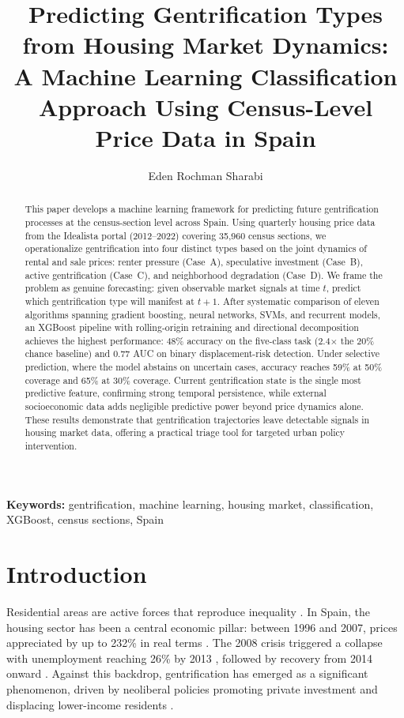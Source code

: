 \documentclass[12pt,a4paper]{article}
\title{Predicting Gentrification Types from Housing Market Dynamics:\\A Machine Learning Classification Approach Using Census-Level Price Data in Spain}
\author{Eden Rochman Sharabi}
\date{}
\begin{document}
\maketitle

\begin{abstract}
This paper develops a machine learning framework for predicting future gentrification processes at the census-section level across Spain. Using quarterly housing price data from the Idealista portal (2012--2022) covering 35,960 census sections, we operationalize gentrification into four distinct types based on the joint dynamics of rental and sale prices: renter pressure (Case~A), speculative investment (Case~B), active gentrification (Case~C), and neighborhood degradation (Case~D). We frame the problem as genuine forecasting: given observable market signals at time $t$, predict which gentrification type will manifest at $t{+}1$. After systematic comparison of eleven algorithms spanning gradient boosting, neural networks, SVMs, and recurrent models, an XGBoost pipeline with rolling-origin retraining and directional decomposition achieves the highest performance: 48\% accuracy on the five-class task (2.4$\times$ the 20\% chance baseline) and 0.77 AUC on binary displacement-risk detection. Under selective prediction, where the model abstains on uncertain cases, accuracy reaches 59\% at 50\% coverage and 65\% at 30\% coverage. Current gentrification state is the single most predictive feature, confirming strong temporal persistence, while external socioeconomic data adds negligible predictive power beyond price dynamics alone. These results demonstrate that gentrification trajectories leave detectable signals in housing market data, offering a practical triage tool for targeted urban policy intervention.
\end{abstract}

\textbf{Keywords:} gentrification, machine learning, housing market, classification, XGBoost, census sections, Spain

\section{Introduction}

Residential areas are active forces that reproduce inequality \citep{park1916suggestions, wacquant2005deux}. In Spain, the housing sector has been a central economic pillar: between 1996 and 2007, prices appreciated by up to 232\% in real terms \citep{arellano2009burbuja}. The 2008 crisis triggered a collapse with unemployment reaching 26\% by 2013 \citep{naredo2010presupuesto}, followed by recovery from 2014 onward \citep{alves2019recent}. Against this backdrop, gentrification has emerged as a significant phenomenon, driven by neoliberal policies promoting private investment \citep{sequera2013politicas, janoschka2014gentrificacion} and displacing lower-income residents \citep{slater2011gentrification}.
\end{document}
